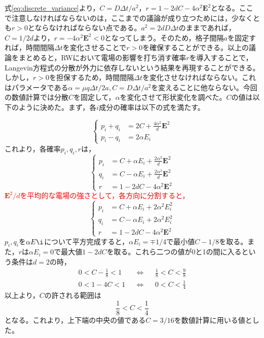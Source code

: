 \documentclass[autodetect-engine,dvi=dvipdfmx,a4paper,ja=standard,oneside,openany,11pt,draft]{bxjsbook}
\begin{document}
式\ref{eq:discrete_variance}より，$C=D\Delta t/a^2$，$r=1-2dC-4\alpha^2\bm{E}^2$となる。ここで注意しなければならないのは，ここまでの議論が成り立つためには，少なくとも$r>0$とならなければならない点である。$a^2=2dD\Delta t$のままであれば，$C=1/2d$より，$r=-4\alpha^2\bm{E}^2<0$となってしまう。そのため，格子間隔$a$を固定すれば，時間間隔$\Delta t$を変化させることで$r>0$を確保することができる。以上の議論をまとめると，RWにおいて電場の影響を打ち消す確率$r$を導入することで，Langevin方程式の分散が外力に依存しないという結果を再現することができる。しかし，$r>0$を担保するため，時間間隔$\Delta t$を変化させなければならない。これはパラメータである$\alpha=\mu q\Delta t/2a,C=D\Delta t/a^2$を変えることに他ならない。今回の数値計算では分散$C$を固定して，$\alpha$を変化させて形状変化を調べた。$C$の値は以下のように決めた。まず，各$i$成分の確率は以下の式を満たす。

\begin{equation}
  \left\{
  \begin{aligned}
    p_i+q_i & =2C+\frac{4\alpha^2}{d}\bm{E}^2 \\
    p_i-q_i & =2\alpha E_i
  \end{aligned}
  \right.
  \label{eq:prob}
\end{equation}
これより，各確率$p_i,q_i,r$は，
\begin{equation}
  \left\{
  \begin{aligned}
    p_i & =C+\alpha E_i+\frac{2\alpha^2}{d}\bm{E}^2 \\
    q_i & =C-\alpha E_i+\frac{2\alpha^2}{d}\bm{E}^2 \\
    r   & =1-2dC-4\alpha^2\bm{E}^2
  \end{aligned}
  \right.
  \label{eq:prob2}
\end{equation}
\textcolor{red}{$\bm{E}^2/d$を平均的な電場の強さとして，各方向に分割すると，}
\begin{equation}
  \left\{
  \begin{aligned}
    p_i & =C+\alpha E_i+2\alpha^2 E_i^2 \\
    q_i & =C-\alpha E_i+2\alpha^2 E_i^2 \\
    r   & =1-2dC-4\alpha^2\bm{E}^2
  \end{aligned}
  \right.
  \label{eq:prob3}
\end{equation}
$p_i,q_i$を$\alpha E\i$について平方完成すると，$\alpha E_i=\mp1/4$で最小値$C-1/8$を取る。また，$r$は$\alpha E_i=0$で最大値$1-2dC$を取る。これら二つの値が0と1の間に入るという条件は$d=2$の時，
\begin{align}
  0<C-\frac{1}{8}<1 &  & \Leftrightarrow &  & \frac{1}{8}<C<\frac{9}{8} \\
  0<1-4C<1          &  & \Leftrightarrow &  & 0<C<\frac{1}{4}
  \label{eq:condition}
\end{align}
以上より，$C$の許される範囲は
\begin{equation}
  \frac{1}{8}<C<\frac{1}{4}
  \label{eq:condition2}
\end{equation}
となる。これより，上下端の中央の値である$C=3/16$を数値計算に用いる値とした。
\end{document}
